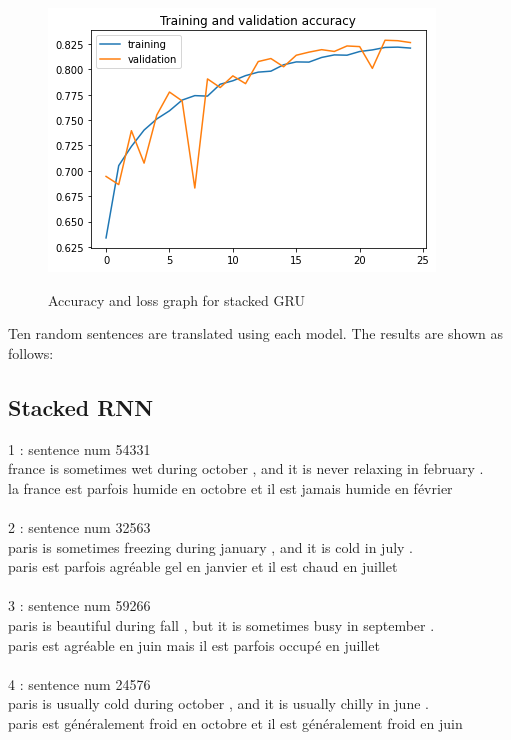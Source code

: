 \documentclass[12pt,oneside,geqno]{article}
\begin{document}
	\begin{figure}
		\centering
		\includegraphics[width=\textwidth]{../figs/stacked_gru_results.png}
		\label{fig:gru}
		\caption{Accuracy and loss graph for stacked GRU}
	\end{figure}
	
	Ten random sentences are translated using each model. The results are shown as follows: 
	\pagebreak
	\subsection{Stacked RNN}
	1 : sentence num 54331\\
	france is sometimes wet during october , and it is never relaxing in february .\\
	la france est parfois humide en octobre et il est jamais humide en février\\\\
	
	2 : sentence num 32563\\
	paris is sometimes freezing during january , and it is cold in july .\\
	paris est parfois agréable gel en janvier et il est chaud en juillet \\\\
	
	3 : sentence num 59266\\
	paris is beautiful during fall , but it is sometimes busy in september .\\
	paris est agréable en juin mais il est parfois occupé en juillet \\\\
	
	4 : sentence num 24576\\
	paris is usually cold during october , and it is usually chilly in june .\\
	paris est généralement froid en octobre et il est généralement froid en juin \\\\
	
\end{document}
